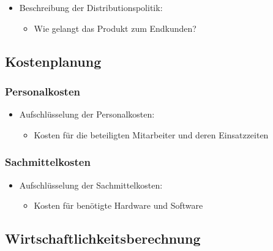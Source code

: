 \begin{itemize}
\item
  Beschreibung der Distributionspolitik:

  \begin{itemize}
  
  \item
    Wie gelangt das Produkt zum Endkunden?
  \end{itemize}
\end{itemize}

\subsection{Kostenplanung}\label{kostenplanung}

\subsubsection{Personalkosten}\label{personalkosten}

\begin{itemize}
\item
  Aufschlüsselung der Personalkosten:

  \begin{itemize}
  
  \item
    Kosten für die beteiligten Mitarbeiter und deren Einsatzzeiten
  \end{itemize}
\end{itemize}

\subsubsection{Sachmittelkosten}\label{sachmittelkosten}

\begin{itemize}
\item
  Aufschlüsselung der Sachmittelkosten:

  \begin{itemize}
  
  \item
    Kosten für benötigte Hardware und Software
  \end{itemize}
\end{itemize}

\subsection{Wirtschaftlichkeitsberechnung}\label{wirtschaftlichkeitsberechnung}

